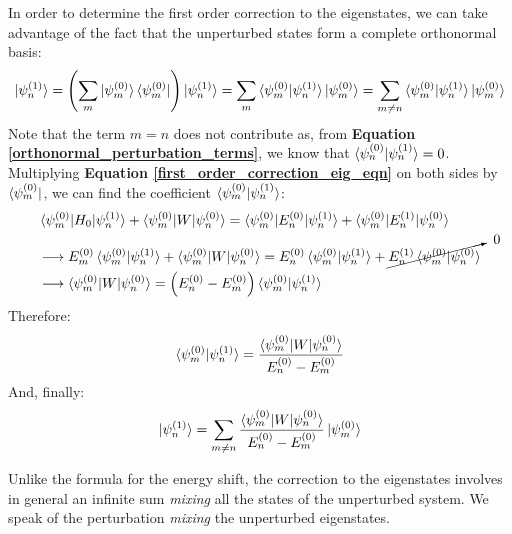 In order to determine the first order correction to the eigenstates, we can take advantage of the fact that the unperturbed states form a complete orthonormal basis:
\begin{equation}
    \ket{\psi_n^{(1)}} = \left(\sum_m \ket{\psi_m^{(0)}}\bra{\psi_m^{(0)}}\right)\ket{\psi_n^{(1)}} = \sum_m \braket{\psi_m^{(0)}|\psi_n^{(1)}}\ket{\psi_m^{(0)}} = \sum_{m\neq n} \braket{\psi_m^{(0)}|\psi_n^{(1)}}\ket{\psi_m^{(0)}}
\end{equation}
Note that the term $m = n$ does not contribute as, from \textbf{Equation \ref{orthonormal_perturbation_terms}}, we know that $\braket{\psi_n^{(0)}|\psi_n^{(1)}} = 0$. Multiplying \textbf{Equation \ref{first_order_correction_eig_eqn}} on both sides by $\bra{\psi_m^{(0)}}$, we can find the coefficient $\braket{\psi_m^{(0)}|\psi_n^{(1)}}$:
\begin{equation}
    \begin{split}
        &\braket{\psi_m^{(0)}|H_0|\psi_n^{(1)}} + \braket{\psi_m^{(0)}|W|\psi_n^{(0)}} = \braket{\psi_m^{(0)}|E_n^{(0)}|\psi_n^{(1)}} + \braket{\psi_m^{(0)}|E_n^{(1)}|\psi_n^{(0)}}\\
        &\longrightarrow E_m^{(0)}\braket{\psi_m^{(0)}|\psi_n^{(1)}} + \braket{\psi_m^{(0)}|W|\psi_n^{(0)}} = E_n^{(0)}\braket{\psi_m^{(0)}|\psi_n^{(1)}} + \cancelto{\ 0}{E_n^{(1)}\braket{\psi_m^{(0)}|\psi_n^{(0)}}} \\
        &\longrightarrow \braket{\psi_m^{(0)}|W|\psi_n^{(0)}} = \left(E_n^{(0)} - E_m^{(0)}\right)\braket{\psi_m^{(0)}|\psi_n^{(1)}}
    \end{split}
\end{equation}
Therefore:
\begin{equation}
    \braket{\psi_m^{(0)}|\psi_n^{(1)}} = \frac{\braket{\psi_m^{(0)}|W|\psi_n^{(0)}}}{E_n^{(0)} - E_m^{(0)}}
\end{equation}
And, finally:
\begin{equation}
    \ket{\psi_n^{(1)}} = \sum_{m\neq n} \frac{\braket{\psi_m^{(0)}|W|\psi_n^{(0)}}}{E_n^{(0)} - E_m^{(0)}}\ket{\psi_m^{(0)}}
\end{equation}

Unlike the formula for the energy shift, the correction to the eigenstates involves in general an infinite sum \textit{mixing} all the states of the unperturbed system. We speak of the perturbation \textit{mixing} the unperturbed eigenstates.


